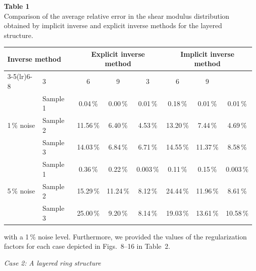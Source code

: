 \documentclass[11pt]{article}
\begin{document}
\vspace{1em}

\noindent\textbf{Table 1}\\[0.2em]
{\small Comparison of the average relative error in the shear
modulus distribution obtained by implicit inverse and explicit
inverse methods for the layered structure.}
\vspace{0.3em}

\begin{center}
\small
\begin{tabular}{@{}ll ccc ccc@{}}
\toprule
\multicolumn{2}{l}{Inverse method}
  & \multicolumn{3}{c}{Explicit inverse method}
  & \multicolumn{3}{c}{Implicit inverse method} \\
\cmidrule(lr){3-5}\cmidrule(lr){6-8}
\multicolumn{2}{l}{Number of surface displacement datasets}
  & 3 & 6 & 9 & 3 & 6 & 9 \\
\midrule
\multirow{3}{*}{1\,\% noise}
  & Sample 1 & 0.04\,\%  & 0.00\,\%  & 0.01\,\%  & 0.18\,\%  & 0.01\,\%  & 0.01\,\%  \\
  & Sample 2 & 11.56\,\% & 6.40\,\%  & 4.53\,\%  & 13.20\,\% & 7.44\,\%  & 4.69\,\%  \\
  & Sample 3 & 14.03\,\% & 6.84\,\%  & 6.71\,\%  & 14.55\,\% & 11.37\,\% & 8.58\,\%  \\
\multirow{3}{*}{5\,\% noise}
  & Sample 1 & 0.36\,\%  & 0.22\,\%  & 0.003\,\% & 0.11\,\%  & 0.15\,\%  & 0.003\,\% \\
  & Sample 2 & 15.29\,\% & 11.24\,\% & 8.12\,\%  & 24.44\,\% & 11.96\,\% & 8.61\,\%  \\
  & Sample 3 & 25.00\,\% & 9.20\,\%  & 8.14\,\%  & 19.03\,\% & 13.61\,\% & 10.58\,\% \\
\bottomrule
\end{tabular}
\end{center}

\vspace{1em}

\noindent
with a 1\,\% noise level. Furthermore, we provided the values of
the regularization factors for each case depicted in Figs.~8--16
in Table~2.

\vspace{0.8em}

\noindent\textit{Case 2: A layered ring structure}

\vspace{0.5em}
\end{document}
